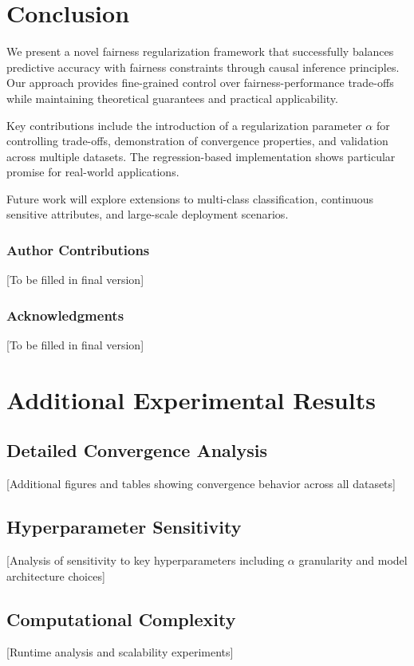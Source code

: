 \documentclass{article} %
\begin{document}
\section{Conclusion}

We present a novel fairness regularization framework that successfully balances predictive accuracy with fairness constraints through causal inference principles. Our approach provides fine-grained control over fairness-performance trade-offs while maintaining theoretical guarantees and practical applicability.

Key contributions include the introduction of a regularization parameter $\alpha$ for controlling trade-offs, demonstration of convergence properties, and validation across multiple datasets. The regression-based implementation shows particular promise for real-world applications.

Future work will explore extensions to multi-class classification, continuous sensitive attributes, and large-scale deployment scenarios.

\subsubsection*{Author Contributions}
[To be filled in final version]

\subsubsection*{Acknowledgments}
[To be filled in final version]




\appendix
\section{Additional Experimental Results}

\subsection{Detailed Convergence Analysis}
[Additional figures and tables showing convergence behavior across all datasets]

\subsection{Hyperparameter Sensitivity}
[Analysis of sensitivity to key hyperparameters including $\alpha$ granularity and model architecture choices]

\subsection{Computational Complexity}
[Runtime analysis and scalability experiments]
\end{document}
